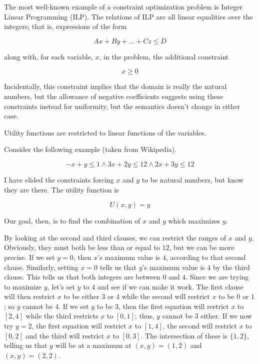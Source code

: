 The most well-known example of a constraint optimization problem is Integer Linear Programming (ILP). The relations of ILP are all linear equalities over the integers; that is, expressions of the form

\begin{equation}
    A x + B y + ... + C z \leq D
\end{equation}

along with, for each variable, $x$, in the problem, the additional constraint

\begin{equation}
    x \geq 0
\end{equation}

Incidentally, this constraint implies that the domain is really the natural numbers, but the allowance of negative coefficients suggests using these constraints instead for uniformity, but the semantics doesn't change in either case.

Utility functions are restricted to linear functions of the variables.

Consider the following example (taken from Wikipedia).

\begin{equation}
    -x + y \leq 1 \wedge
    3x + 2y \leq 12 \wedge
    2x + 3y \leq 12
\end{equation}

I have elided the constraints forcing $x$ and $y$ to be natural numbers, but know they are there. The utility function is

\begin{equation}
    U(x, y) = y
\end{equation}

Our goal, then, is to find the combination of $x$ and $y$ which maximizes $y$. 

By looking at the second and third clauses, we can restrict the ranges of $x$ and $y$. Obviously, they must both be less than or equal to $12$, but we can be more precise. If we set $y = 0$, then $x$'s maximum value is $4$, according to that second clause. Similarly, setting $x = 0$ tells us that $y$'s maximum value is $4$ by the third clause. This tells us that both integers are between $0$ and $4$. Since we are trying to maximize $y$, let's set $y$ to $4$ and see if we can make it work. The first clause will then restrict $x$ to be either $3$ or $4$ while the second will restrict $x$ to be $0$ or $1$; so $y$ cannot be $4$. If we set $y$ to be $3$, then the first equation will restrict $x$ to $[2, 4]$ while the third restricts $x$ to $[0, 1]$; thus, $y$ cannot be $3$ either. If we now try $y=2$, the first equation will restrict $x$ to $[1, 4]$, the second will restrict $x$ to $[0, 2]$ and the third will restrict $x$ to $[0, 3]$. The intersection of these is $\{1, 2\}$, telling us that $y$ will be at a maximum at $(x, y) = (1, 2)$ and $(x, y) = (2, 2)$.

